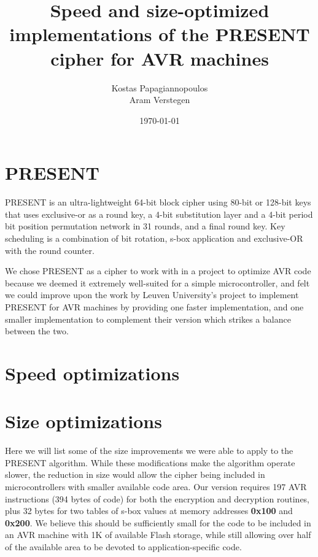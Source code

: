 \documentclass{llncs}
\begin{document}
\title{Speed and size-optimized implementations of the PRESENT cipher for AVR machines}
\author{
Kostas Papagiannopoulos \\
Aram Verstegen
}
\date{\today}

\maketitle


\section{PRESENT}
PRESENT \cite{bogdanov2007present} is an ultra-lightweight 64-bit block cipher using 80-bit or 128-bit keys that uses exclusive-or as a round key, a 4-bit substitution layer and a 4-bit period bit position permutation network in 31 rounds, and a final round key.
Key scheduling is a combination of bit rotation, s-box application and exclusive-OR with the round counter.

We chose PRESENT as a cipher to work with in a project to optimize AVR code because we deemed it extremely well-suited for a simple microcontroller, and felt we could improve upon the work by Leuven University's project to implement PRESENT for AVR machines \cite{eisenbarth2012compact} by providing one faster implementation, and one smaller implementation to complement their version which strikes a balance between the two.


\section{Speed optimizations}
\cite{gong2009towards}
\section{Size optimizations}

Here we will list some of the size improvements we were able to apply to the PRESENT algorithm.
While these modifications make the algorithm operate slower, the reduction in size would allow the cipher being included in microcontrollers with smaller available code area.
Our version requires 197 AVR instructions (394 bytes of code) for both the encryption and decryption routines, plus 32 bytes for two tables of s-box values at memory addresses \textbf{0x100} and \textbf{0x200}.
We believe this should be sufficiently small for the code to be included in an AVR machine with 1K of available Flash storage, while still allowing over half of the available area to be devoted to application-specific code.
\end{document}
